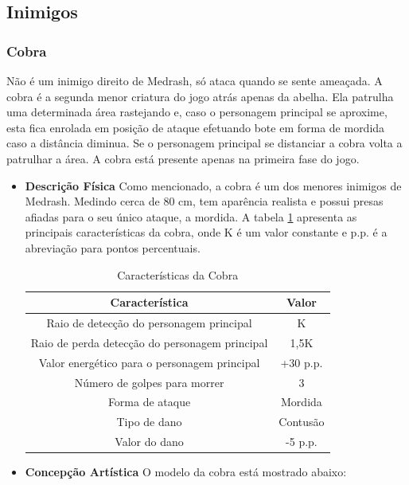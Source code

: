 \subsection{Inimigos}
\subsubsection{Cobra}
Não é um inimigo direito de Medrash, só ataca quando se sente ameaçada. A
 cobra é a segunda menor criatura do jogo atrás apenas da abelha. Ela
 patrulha uma determinada área rastejando e, caso o personagem principal se
 aproxime, esta fica enrolada em posição de ataque efetuando bote em forma
 de mordida caso a distância diminua. Se o personagem principal se
 distanciar a cobra volta a patrulhar a área. A cobra está presente apenas
 na primeira fase do jogo.
\begin{itemize}
\item {\bf Descrição Física}
Como mencionado, a cobra é um dos menores inimigos de Medrash. Medindo
 cerca de 80 cm, tem aparência realista e possui presas afiadas para o seu
 único ataque, a mordida. A tabela \ref{table:cobra} apresenta as principais
 características da cobra, onde K é um valor constante e p.p. é a
 abreviação para pontos percentuais.
\begin{table}[!ht]
\begin{center}
\begin{tabular}{|c|c|}
\hline 
\textbf{Característica} & \textbf{Valor} \\ 
\hline 
Raio de detecção do personagem principal & K \\ 
\hline 
Raio de perda detecção do personagem principal & 1,5K \\ 
\hline 
Valor energético para o personagem principal & +30 p.p. \\ 
\hline 
Número de golpes para morrer & 3 \\ 
\hline 
Forma de ataque & Mordida \\ 
\hline 
Tipo de dano & Contusão \\ 
\hline 
Valor do dano & -5 p.p. \\ 
\hline 
\end{tabular} 
\end{center}
\caption{Características da Cobra}
\label{table:cobra}
\end{table}
\item {\bf Concepção Artística}
O modelo da cobra está mostrado abaixo:



\end{itemize}
